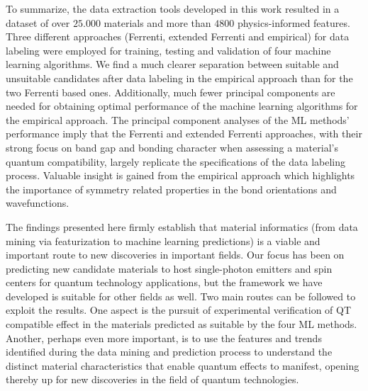 \documentclass[superscriptaddress,unsortedaddress,
 amsmath,amssymb,
 aps,
]{revtex4-2}
\begin{document}
To summarize, the data extraction tools developed in this work resulted in a dataset of over $25.000$ materials and more than $4800$ physics-informed features. Three different approaches (Ferrenti, extended Ferrenti and empirical) for data labeling were employed for training, testing and validation of four machine learning algorithms. 
We find a much clearer separation between suitable and unsuitable candidates after data labeling in the empirical approach than for the two Ferrenti based ones. 
Additionally, much fewer principal components are needed for obtaining optimal performance of the machine learning algorithms for the empirical approach.
The principal component analyses of the ML methods' performance imply that the Ferrenti and extended Ferrenti approaches, with their strong focus on band gap and bonding character when assessing a material's quantum compatibility, largely replicate the specifications of the data labeling process. 
Valuable insight is gained from the empirical approach which highlights the importance of symmetry related properties in the bond orientations and wavefunctions.%

The findings presented here firmly establish that material informatics (from data mining via featurization to machine learning predictions) is a viable and important route to new discoveries in important fields.  Our focus has been on predicting new candidate materials to host single-photon emitters and spin centers for quantum technology applications, but the framework we have developed is suitable for other fields as well. 
Two main routes can be followed to exploit the results. One aspect is the pursuit of experimental verification of QT compatible effect in the materials predicted as suitable by the four ML methods. Another, perhaps even more important, is to use the features and trends identified during the data mining and prediction process to understand the distinct material characteristics that enable quantum effects to manifest, opening  thereby up for new discoveries in the field of quantum technologies. 
\end{document}
